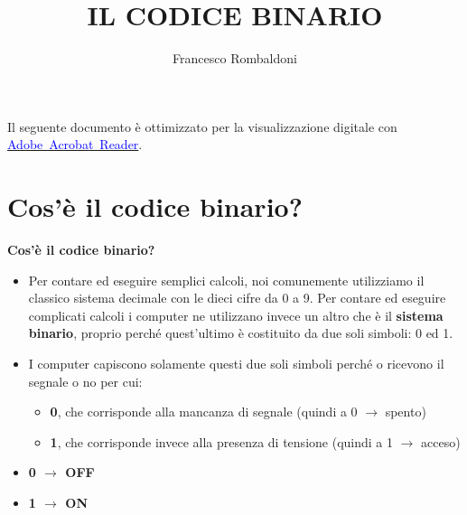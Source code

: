 \documentclass[hidelinks,aspectratio=169]{beamer}
\title[IL CODICE BINARIO]{\textbf{IL CODICE BINARIO}}
\author{Francesco Rombaldoni}
\date{}
\begin{document}
	
	\begin{frame}
		\maketitle
		
		\vspace*{\fill}
		\centering
		\fboxrule=2pt
		\fbox
		{
			\begin{minipage}{0.9\linewidth}
				\small{Il seguente documento è ottimizzato per la visualizzazione digitale con \href{https://get.adobe.com/it/reader/}{\textcolor{blue}{Adobe~Acrobat~Reader}}.}  
			\end{minipage}
		}
	\end{frame}
	
	\begin{frame}
		\tableofcontents
	\end{frame}
	
	\section{\textbf{Cos'è il codice binario?}}
	\begin{frame}{\textbf{Cos'è il codice binario?}}
		\begin{center}
			\begin{itemize}
				\item Per contare ed eseguire semplici calcoli, noi comunemente
				utilizziamo il classico sistema decimale con le dieci cifre da 0 a 9.\newline
				Per contare ed eseguire complicati calcoli i computer ne utilizzano
				invece un altro che è il \textbf{sistema binario},
				proprio perché quest'ultimo è costituito da due soli simboli: 0 ed 1.
			\end{itemize}
			\vspace*{0.5cm}
			\begin{itemize}
				\item I computer capiscono solamente questi due soli simboli perché o
				ricevono il segnale o no per cui:
				\begin{itemize}
					\item \textbf{0}, che corrisponde alla mancanza di segnale (quindi a 0 $\rightarrow$ spento)
					\item \textbf{1}, che corrisponde invece alla presenza di tensione (quindi a 1  $\rightarrow$ acceso)
				\end{itemize}
			\end{itemize}
		\end{center}
		\vspace*{0.5cm}
		\begin{center}
			\begin{itemize}
				\item \hspace*{5cm}\textbf{0 $\rightarrow$ OFF}
				\item \hspace*{5cm}\textbf{1 $\rightarrow$ ON}
			\end{itemize}
		\end{center}
	\end{frame}
	
\end{document}

